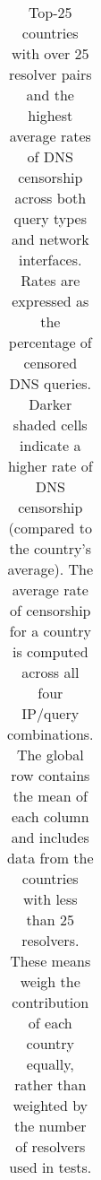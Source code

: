 \begin{table}[t]
{\begin{tabular}{lcccccc}
  \bottomrule
  \end{tabular}
  }
  \caption{
  Top-25 countries with over 25 resolver pairs and the highest average
  rates of DNS censorship across both query types and network interfaces. Rates
  are expressed as the percentage of censored DNS queries.
  Darker shaded cells indicate a higher rate of DNS censorship (compared to the
  country's average).  %
  The average rate of censorship for a country is computed across all four
  IP/query combinations.
  The global row contains the mean of each column and includes data from the
  countries with less than 25 resolvers. These means weigh the contribution of
  each country equally, rather than weighted by the number of resolvers used in
  tests.   }
  \label{tab:prevalence:rates}
\end{table}

